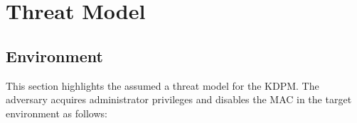 \section{Threat Model} \label{seciton:threatmodel}
\subsection{Environment}


This section highlights the assumed a threat model for the KDPM.
%
The adversary acquires administrator privileges and disables the MAC in the
target environment as follows:


